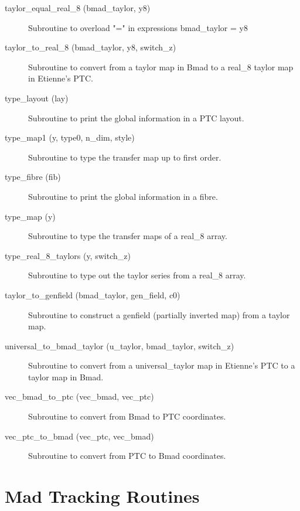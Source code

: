 \begin{description}
\item[taylor\_equal\_real\_8 (bmad\_taylor, y8)] \Newline
Subroutine to overload "=" in expressions bmad\_taylor = y8 

\item[taylor\_to\_real\_8 (bmad\_taylor, y8, switch\_z)] \Newline
Subroutine to convert from a taylor map in Bmad to a real\_8 taylor map in Etienne's PTC. 

\item[type\_layout (lay)] \Newline
Subroutine to print the global information in a PTC layout.

\item[type\_map1 (y, type0, n\_dim, style)] \Newline
Subroutine to type the transfer map up to first order. 

\item[type\_fibre (fib)] \Newline
Subroutine to print the global information in a fibre.

\item[type\_map (y)] \Newline
Subroutine to type the transfer maps of a real\_8 array. 

\item[type\_real\_8\_taylors (y, switch\_z)] \Newline
Subroutine to type out the taylor series from a real\_8 array. 

\item[taylor\_to\_genfield (bmad\_taylor, gen\_field, c0)] \Newline
Subroutine to construct a genfield (partially inverted map) from a taylor map. 

\item[universal\_to\_bmad\_taylor (u\_taylor, bmad\_taylor, switch\_z)] \Newline
Subroutine to convert from a universal\_taylor map in Etienne's PTC to a taylor map in Bmad. 

\item[vec\_bmad\_to\_ptc (vec\_bmad, vec\_ptc)] \Newline
Subroutine to convert from Bmad to PTC coordinates. 

\item[vec\_ptc\_to\_bmad (vec\_ptc, vec\_bmad)] \Newline
Subroutine to convert from PTC to Bmad coordinates. 

\end{description}

\section{Mad Tracking Routines}
\label{r:mad}      

